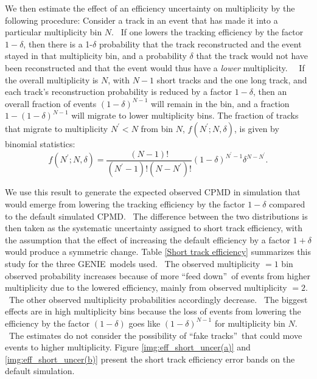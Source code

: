 \documentclass{article}
\begin{document}
We then estimate the effect of an efficiency uncertainty on multiplicity by
the following procedure: Consider a track in an event that has made it into a particular multiplicity bin $N$. \ If one lowers the tracking efficiency by the factor $%
1-\delta $, then there is a 1-$\delta$ probability that the track reconstructed and the event stayed in that multiplicity bin, and a probability $\delta $ that the track
would not have been reconstructed and that the event would thus have a \emph{%
lower} multiplicity. \ \ If the overall multiplicity is $N$, with $N-1$ short
tracks and the one long track, and each track's reconstruction probability
is reduced by a factor $1-\delta $, then an overall fraction of events $%
\left( 1-\delta \right) ^{N-1}$ will remain in the bin, and a fraction $%
1-\left( 1-\delta \right) ^{N-1}$ will migrate to lower multiplicity bins.
The fraction of tracks that migrate to multiplicity $N^{\prime }<N$ from bin 
$N$, $f\left( N^{\prime };N,\delta \right) $, is given by binomial
statistics:%
\begin{equation}
f\left( N^{\prime };N,\delta \right) =\frac{\left( N-1\right) !}{\left(
N^{\prime }-1\right) !\left( N-N^{\prime }\right) !}\left( 1-\delta \right)
^{N^{\prime }-1}\delta ^{N-N^{\prime }}.
\end{equation}

We use this result to generate the expected observed CPMD in simulation that
would emerge from lowering the tracking efficiency by the factor $1-\delta $
compared to the default simulated CPMD. \ The difference between the two
distributions is then taken as the systematic uncertainty assigned to short
track efficiency, with the assumption that the effect of increasing the
default efficiency by a factor $1+\delta $ would produce a symmetric change.
Table \ref{Short track efficiency} summarizes this study for the three
GENIE\ models used. \ The observed multiplicity $=1$ bin observed
probability increases because of more \textquotedblleft feed
down\textquotedblright\ of events from higher multiplicity due to the
lowered efficiency, mainly from observed multiplicity $=2$. \ The other
observed multiplicity probabilities accordingly decrease. \ The biggest
effects are in high multiplicity bins because the loss of events from
lowering the efficiency by the factor $\left( 1-\delta \right) $ goes like $%
\left( 1-\delta \right) ^{N-1}$ for multiplicity bin $N$. \ The estimates do
not consider the possibility of \textquotedblleft fake
tracks\textquotedblright\ that could move events to higher multiplicity. Figure \ref{img:eff_short_uncer(a)} and \ref{img:eff_short_uncer(b)} present the short track efficiency error bands on the default simulation.
\end{document}
